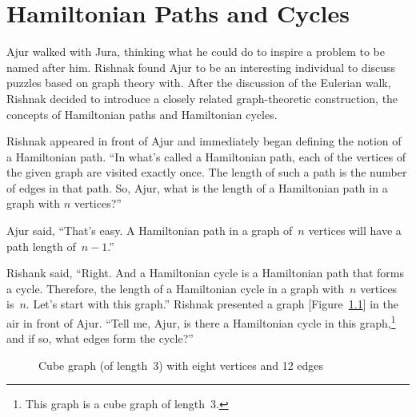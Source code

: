 \chapter{Hamiltonian Paths and Cycles}

Ajur walked with Jura, thinking what he could do to inspire a problem to be named after him. Rishnak found Ajur to be an interesting individual to discuss puzzles based on graph theory with. After the discussion of the Eulerian walk, Rishnak decided to introduce a closely related graph-theoretic construction, the concepts of Hamiltonian paths and Hamiltonian cycles.

Rishnak appeared in front of Ajur and immediately began defining the notion of a Hamiltonian path. ``In what's called a Hamiltonian path, each of the vertices of the given graph are visited exactly once. The length of such a path is the number of edges in that path. So, Ajur, what is the length of a Hamiltonian path in a graph with $n$ vertices?''

Ajur said, ``That's easy. A Hamiltonian path in a graph of~$n$ vertices will have a path length of~$n-1$.''

Rishank said, ``Right. And a Hamiltonian cycle is a Hamiltonian path that forms a cycle. Therefore, the length of a Hamiltonian cycle in a graph with~$n$ vertices is~$n$. Let's start with this graph.'' Rishnak presented a graph [Figure~\ref{5g1}] in the air in front of Ajur. ``Tell me, Ajur, is there a Hamiltonian cycle in this graph,\footnote{This graph is a cube graph of length~3.} and if so, what edges form the cycle?''

\begin{figure}
\begin{center}
\caption{Cube graph (of length~3) with eight vertices and 12 edges}\label{5g1}
\end{center}
\end{figure}

